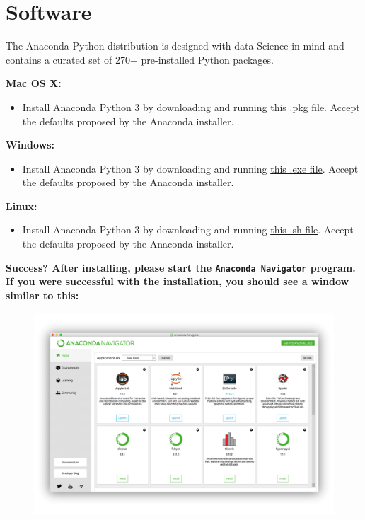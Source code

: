 \documentclass[]{book}
\providecommand{\tightlist}{%
  \setlength{\itemsep}{0pt}\setlength{\parskip}{0pt}}
\begin{document}
\section{Software}\label{software-1}

The Anaconda Python distribution is designed with data Science in mind
and contains a curated set of 270+ pre-installed Python packages.

\textbf{Mac OS X:}

\begin{itemize}
\tightlist
\item
  Install Anaconda Python 3 by downloading and running
  \href{https://repo.anaconda.com/archive/Anaconda3-2019.10-MacOSX-x86_64.pkg}{this
  .pkg file}. Accept the defaults proposed by the Anaconda installer.
\end{itemize}

\textbf{Windows:}

\begin{itemize}
\tightlist
\item
  Install Anaconda Python 3 by downloading and running
  \href{https://repo.anaconda.com/archive/Anaconda3-2019.10-Windows-x86_64.exe}{this
  .exe file}. Accept the defaults proposed by the Anaconda installer.
\end{itemize}

\textbf{Linux:}

\begin{itemize}
\tightlist
\item
  Install Anaconda Python 3 by downloading and running
  \href{https://repo.anaconda.com/archive/Anaconda3-2019.10-Linux-x86_64.sh}{this
  .sh file}. Accept the defaults proposed by the Anaconda installer.
\end{itemize}

\textbf{Success? After installing, please start the
\texttt{Anaconda\ Navigator} program. If you were successful with the
installation, you should see a window similar to this:}

\begin{figure}
\centering
\includegraphics{Python/PythonInstall/images/Anaconda_navigator.png}
\caption{}
\end{figure}
\end{document}
